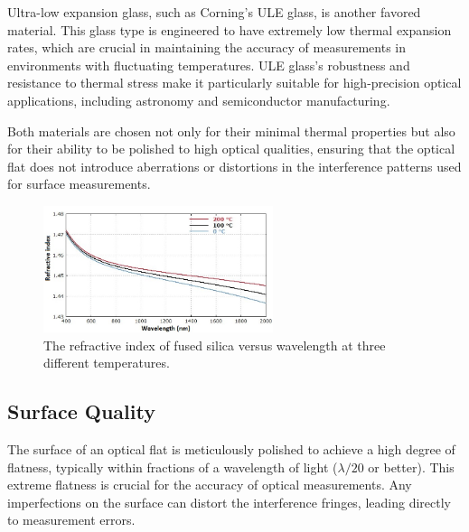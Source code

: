 \documentclass[../main.tex]{subfiles}
\begin{document}
Ultra-low expansion glass, such as Corning's ULE glass, is another favored material. This glass type is engineered to have extremely low thermal expansion rates, which are crucial in maintaining the accuracy of measurements in environments with fluctuating temperatures. ULE glass's robustness and resistance to thermal stress make it particularly suitable for high-precision optical applications, including astronomy and semiconductor manufacturing.\cite{Corning_2022}

Both materials are chosen not only for their minimal thermal properties but also for their ability to be polished to high optical qualities, ensuring that the optical flat does not introduce aberrations or distortions in the interference patterns used for surface measurements.\cite{Corning_2022,Paschottafused_silica,doi:https://doi.org/10.1002/9780470135976.ch1}

\vspace{-12pt}


\begin{figure}[H]
    \centering
    \includegraphics[width=0.6\textwidth]{Images/Introduction/silica_refractive_index2}
    \vspace{-8pt}
    \caption{The refractive index of fused silica versus wavelength at three different temperatures. \cite{Paschottafused_silica}}
    \label{fig:refractive_index_silica}
\end{figure}

\vspace{-25pt}

\subsection{Surface Quality}

\vspace{-15pt}

The surface of an optical flat is meticulously polished to achieve a high degree of flatness, typically within fractions of a wavelength of light (\(\lambda/20\) or better). This extreme flatness is crucial for the accuracy of optical measurements. Any imperfections on the surface can distort the interference fringes, leading directly to measurement errors.\cite{enwiki:1212101911}
\end{document}
